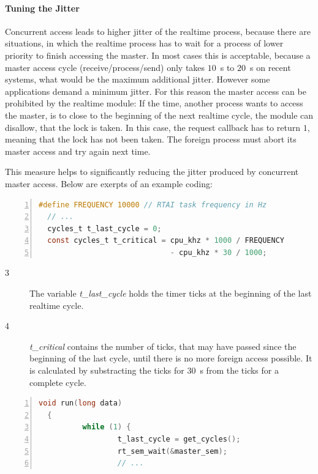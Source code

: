 \documentclass[a4paper,12pt,BCOR6mm,bibtotoc,idxtotoc]{scrbook}
\begin{document}
\paragraph{Tuning the Jitter}

Concurrent access leads to higher jitter of the realtime process,
because there are situations, in which the realtime process has to
wait for a process of lower priority to finish accessing the master.
In most cases this is acceptable, because a master access cycle
(receive/process/send) only takes $10$~\textmu s to $20$~\textmu s on
recent systems, what would be the maximum additional jitter. However
some applications demand a minimum jitter. For this reason the master
access can be prohibited by the realtime module: If the time, another
process wants to access the master, is to close to the beginning of
the next realtime cycle, the module can disallow, that the lock is
taken. In this case, the request callback has to return $1$, meaning
that the lock has not been taken. The foreign process must abort its
master access and try again next time.

This measure helps to significantly reducing the jitter produced by
concurrent master access. Below are exerpts of an example coding:

\begin{lstlisting}[language=C,numbers=left,caption={Variables for
    jitter reduction},label={lst:redvar}]
  #define FREQUENCY 10000 // RTAI task frequency in Hz
  // ...
  cycles_t t_last_cycle = 0;
  const cycles_t t_critical = cpu_khz * 1000 / FREQUENCY
                              - cpu_khz * 30 / 1000;
\end{lstlisting}

\begin{description}
\item[\normalfont\textcircled{\tiny 3}] The variable
  \textit{t\_last\_cycle} holds the timer ticks at the beginning of
  the last realtime cycle.
\item[\normalfont\textcircled{\tiny 4}] \textit{t\_critical} contains
  the number of ticks, that may have passed since the beginning of the
  last cycle, until there is no more foreign access possible. It is
  calculated by substracting the ticks for $30$~\textmu s from the
  ticks for a complete cycle.
\end{description}

\begin{lstlisting}[language=C,numbers=left,caption={Cyclic function
    with reduced jitter},label={lst:redrun}]
  void run(long data)
  {
          while (1) {
                  t_last_cycle = get_cycles();
                  rt_sem_wait(&master_sem);
                  // ...
\end{lstlisting}
\end{document}
